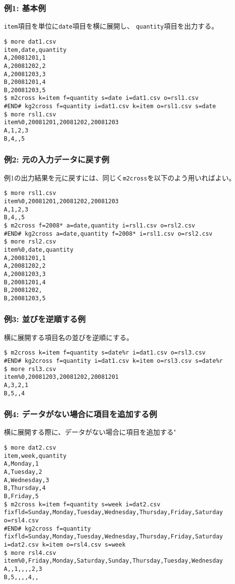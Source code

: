 \subsubsection*{例1: 基本例}

\verb|item|項目を単位に\verb|date|項目を横に展開し、
\verb|quantity|項目を出力する。


\begin{Verbatim}[baselinestretch=0.7,frame=single]
$ more dat1.csv
item,date,quantity
A,20081201,1
A,20081202,2
A,20081203,3
B,20081201,4
B,20081203,5
$ m2cross k=item f=quantity s=date i=dat1.csv o=rsl1.csv
#END# kg2cross f=quantity i=dat1.csv k=item o=rsl1.csv s=date
$ more rsl1.csv
item%0,20081201,20081202,20081203
A,1,2,3
B,4,,5
\end{Verbatim}
\subsubsection*{例2: 元の入力データに戻す例}

例1の出力結果を元に戻すには、同じく\verb|m2cross|を以下のよう用いればよい。


\begin{Verbatim}[baselinestretch=0.7,frame=single]
$ more rsl1.csv
item%0,20081201,20081202,20081203
A,1,2,3
B,4,,5
$ m2cross f=2008* a=date,quantity i=rsl1.csv o=rsl2.csv
#END# kg2cross a=date,quantity f=2008* i=rsl1.csv o=rsl2.csv
$ more rsl2.csv
item%0,date,quantity
A,20081201,1
A,20081202,2
A,20081203,3
B,20081201,4
B,20081202,
B,20081203,5
\end{Verbatim}
\subsubsection*{例3: 並びを逆順する例}

横に展開する項目名の並びを逆順にする。


\begin{Verbatim}[baselinestretch=0.7,frame=single]
$ m2cross k=item f=quantity s=date%r i=dat1.csv o=rsl3.csv
#END# kg2cross f=quantity i=dat1.csv k=item o=rsl3.csv s=date%r
$ more rsl3.csv
item%0,20081203,20081202,20081201
A,3,2,1
B,5,,4
\end{Verbatim}
\subsubsection*{例4: データがない場合に項目を追加する例}

横に展開する際に、データがない場合に項目を追加する"


\begin{Verbatim}[baselinestretch=0.7,frame=single]
$ more dat2.csv
item,week,quantity
A,Monday,1
A,Tuesday,2
A,Wednesday,3
B,Thursday,4
B,Friday,5
$ m2cross k=item f=quantity s=week i=dat2.csv fixfld=Sunday,Monday,Tuesday,Wednesday,Thursday,Friday,Saturday o=rsl4.csv
#END# kg2cross f=quantity fixfld=Sunday,Monday,Tuesday,Wednesday,Thursday,Friday,Saturday i=dat2.csv k=item o=rsl4.csv s=week
$ more rsl4.csv
item%0,Friday,Monday,Saturday,Sunday,Thursday,Tuesday,Wednesday
A,,1,,,,2,3
B,5,,,,4,,
\end{Verbatim}
